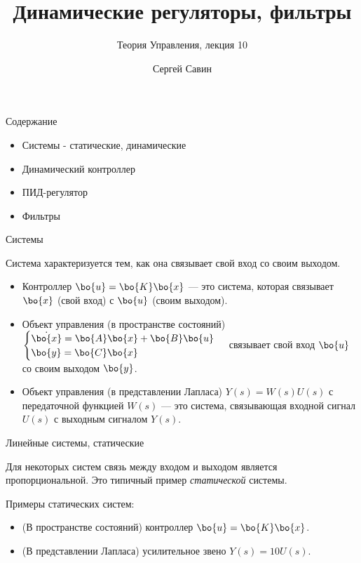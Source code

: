 \documentclass{beamer}
\title{Динамические регуляторы, фильтры}
\subtitle{Теория Управления, лекция 10}
\author{Сергей Савин}
\date{\mydate}
\begin{document}
\maketitle

\begin{frame}{Содержание}
	\begin{itemize}
		\item Системы - статические, динамические
		\item Динамический контроллер
		\item ПИД-регулятор
		\item Фильтры
	\end{itemize}
\end{frame}

\begin{frame}{Системы}
	\begin{flushleft}
		
		Система характеризуется тем, как она связывает свой вход со своим выходом.
		
		\begin{itemize}
			\item Контроллер $\bo{u} = \bo{K}\bo{x}$ — это система, которая связывает $\bo{x}$ (свой вход) с $\bo{u}$ (своим выходом).
			
			\item Объект управления (в пространстве состояний) 
			$\begin{cases}
				\dot {\bo{x}} = \bo{A} \bo{x} + \bo{B} \bo{u} \\
				\bo{y} = \bo{C} \bo{x}
			\end{cases}$ 
			связывает свой вход $\bo{u}$ со своим выходом $\bo{y}$.
			
			\item Объект управления (в представлении Лапласа) $Y(s) = W(s)U(s)$ с передаточной функцией $W(s)$ — это система, связывающая входной сигнал $U(s)$ с выходным сигналом $Y(s)$.
		\end{itemize}
		
	\end{flushleft}
\end{frame}

\begin{frame}{Линейные системы, статические}
	\begin{flushleft}
		
		Для некоторых систем связь между входом и выходом является пропорциональной. Это типичный пример \emph{статической} системы.
		
		\bigskip
		
		Примеры статических систем:
		
		\begin{itemize}
			\item (В пространстве состояний) контроллер $\bo{u} = \bo{K}\bo{x}$. 
			
			\item (В представлении Лапласа) усилительное звено $Y(s) = 10 U(s)$.
		\end{itemize}
		
		
	\end{flushleft}
\end{frame}
\end{document}
